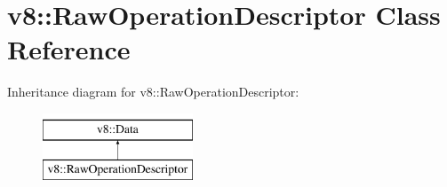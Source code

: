 \hypertarget{classv8_1_1RawOperationDescriptor}{}\section{v8\+:\+:Raw\+Operation\+Descriptor Class Reference}
\label{classv8_1_1RawOperationDescriptor}
Inheritance diagram for v8\+:\+:Raw\+Operation\+Descriptor\+:\begin{figure}[H]
\begin{center}
\leavevmode
\includegraphics[height=2.000000cm]{classv8_1_1RawOperationDescriptor}
\end{center}
\end{figure}
